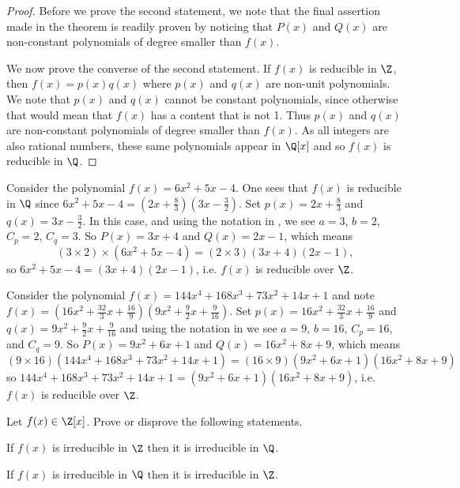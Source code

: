 \begin{proof}
    Before we prove the second statement, we note that the final assertion made in the theorem is readily proven by noticing that $P(x)$ and $Q(x)$ are non-constant polynomials of degree smaller than $f(x)$.

    We now prove the converse of the second statement. If $f(x)$ is reducible in $\Z$, then $f(x) = p(x)q(x)$ where $p(x)$ and $q(x)$ are non-unit polynomials. We note that $p(x)$ and $q(x)$ cannot be constant polynomials, since otherwise that would mean that $f(x)$ has a content that is not 1. Thus $p(x)$ and $q(x)$ are non-constant polynomials of degree smaller than $f(x)$. As all integers are also rational numbers, these same polynomials appear in $\Q[x]$ and so $f(x)$ is reducible in $\Q$.
\end{proof}

\begin{example}
    Consider the polynomial $f(x) = 6x^2 + 5x - 4$. One sees that $f(x)$ is reducible in $\Q$ since $6x^2 + 5x - 4 = \left(2x + \frac83\right)\left(3x - \frac32\right)$. Set $p(x) = 2x + \frac83$ and $q(x) = 3x - \frac32$. In this case, and using the notation in , we see $a = 3$, $b = 2$, $C_p = 2$, $C_q = 3$. So $P(x) = 3x + 4$ and $Q(x) = 2x - 1$, which means
    \[
        (3\times2)\times (6x^2 + 5x - 4) = (2\times3)(3x+4)(2x-1),
    \]
    so $6x^2 + 5x - 4 = (3x+4)(2x-1)$, i.e. $f(x)$ is reducible over $\Z$.
\end{example}

\begin{example}
    Consider the polynomial $f(x) = 144x^4 + 168x^3 + 73x^2 + 14x + 1$ and note $f(x) = \left(16x^2 + \frac{32}3x + \frac{16}9\right)\left(9x^2 + \frac92x + \frac9{16}\right)$. Set $p(x) = 16x^2 + \frac{32}3x + \frac{16}9$ and $q(x) = 9x^2 + \frac92x + \frac9{16}$ and using the notation in  we see $a = 9$, $b = 16$, $C_p = 16$, and $C_q = 9$. So $P(x) = 9x^2+6x+1$ and $Q(x) = 16x^2 + 8x + 9$, which means
    \[
        (9 \times 16)\left(144x^4 + 168x^3 + 73x^2 + 14x + 1\right) = (16 \times 9)(9x^2+6x+1)(16x^2 + 8x + 9)
    \]
    so $144x^4 + 168x^3 + 73x^2 + 14x + 1 = (9x^2+6x+1)(16x^2 + 8x + 9)$, i.e. $f(x)$ is reducible over $\Z$.
\end{example}

\begin{exercise}
    Let $f(x) \in \Z[x]$. Prove or disprove the following statements.
    \begin{partquestions}{\alph*}
        \item If $f(x)$ is irreducible in $\Z$ then it is irreducible in $\Q$.
        \item If $f(x)$ is irreducible in $\Q$ then it is irreducible in $\Z$.
    \end{partquestions}
\end{exercise}

